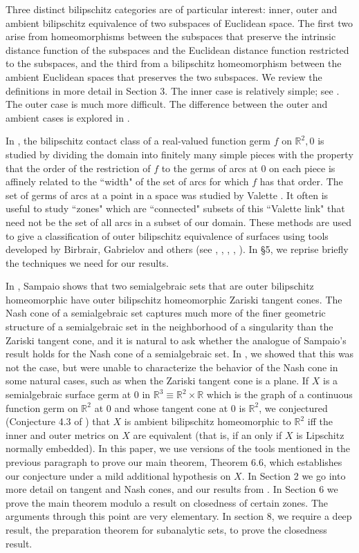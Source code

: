 \documentclass[article]{amsart}
\newcommand{\R}{\mathbb R}
\newcommand{\0}{{\bf 0}}
\begin{document}
Three distinct bilipschitz categories are of particular interest: inner, outer and ambient  bilipschitz equivalence of two subspaces of Euclidean space.  The first two arise from homeomorphisms between the subspaces that preserve the intrinsic distance function of the subspaces and the Euclidean distance function restricted to the subspaces, and the third from a bilipschitz homeomorphism between the ambient Euclidean spaces that preserves the two subspaces. We review the definitions in more detail in Section 3. The inner case is relatively simple; see \cite{B}. The outer case is much more difficult.  The difference between the outer and ambient cases is explored in \cite{BG1}.


In \cite{BFGG}, the bilipschitz contact class of a real-valued function germ $f$ on $\R^2,0$ is studied by dividing the domain into finitely many simple pieces with the property that the order of the restriction of $f$ to the germs of arcs at $0$ on each piece is affinely related to the ``width" of the set of arcs for which $f$ has that order.  The set of germs of arcs at a point in a space was studied by Valette \cite{V}. It often is useful to study ``zones" which are ``connected" subsets of this ``Valette link" that need not be the set of all arcs in a subset of our domain. These methods are used to give a classification of outer bilipschitz equivalence of surfaces using tools developed by Birbrair, Gabrielov and others (see \cite{BFGG},   \cite{BG2}, \cite{BG3}, \cite{BG4}, \cite{GS}). In \S 5, we reprise briefly the techniques we need for our results.  

In \cite{S}, Sampaio shows that two semialgebraic sets that are outer bilipschitz homeomorphic have outer bilipschitz homeomorphic Zariski tangent cones.  
The Nash cone of a semialgebraic set captures much more of the finer geometric structure of a semialgebraic set in the neighborhood of a singularity than the Zariski tangent cone, and it is natural to ask whether the analogue of Sampaio's result holds for the Nash cone of a semialgebraic set.  In \cite{OW1}, we showed that this was not the case, but were unable to characterize the behavior of the Nash cone in some natural cases, such as when the Zariski tangent cone is a plane. If $X$ is a semialgebraic surface germ at $0$ in $\R^3 \equiv \R^2 \times \R$ which is the graph of a continuous function germ on $\R^2$ at $0$ and whose tangent cone at $0$ is $\R^2$, we conjectured (Conjecture 4.3 of \cite{OW1}) that $X$ is ambient bilipschitz homeomorphic to $\R^2$ iff the inner and outer metrics on $X$ are equivalent (that is, if an only if $X$ is Lipschitz normally embedded). In this paper, we use versions of the tools mentioned in the previous paragraph to prove our main theorem, Theorem 6.6, which establishes our conjecture under a mild additional hypothesis on $X$.  In Section 2 we go into more detail on tangent and Nash cones, and our results from \cite{OW}.   In Section 6 we prove the main theorem modulo a result on closedness of certain zones.  The arguments through this point are very elementary.  In section 8, we require a deep result, the preparation theorem for subanalytic sets, to prove the closedness result.  
\end{document}
